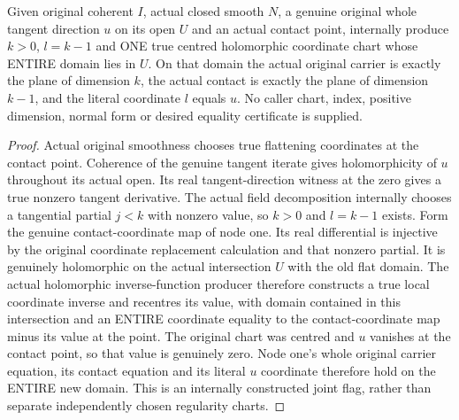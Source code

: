 \begin{theorem}
\label{hir:submersion-contact-coordinates-internal-original-chart}
\leanok
Given original coherent $I$, actual closed smooth $N$, a genuine original
whole tangent direction $u$ on its open $U$ and an actual contact point,
internally produce $k>0$, $l=k-1$ and ONE true centred holomorphic coordinate
chart whose ENTIRE domain lies in $U$. On that domain the actual original
carrier is exactly the plane of dimension $k$, the actual contact is exactly
the plane of dimension $k-1$, and the literal coordinate $l$ equals $u$.
No caller chart, index, positive dimension, normal form or desired equality
certificate is supplied.
\end{theorem}
\begin{proof}
Actual original smoothness chooses true flattening coordinates at the
contact point. Coherence of the genuine tangent iterate gives holomorphicity
of $u$ throughout its actual open. Its real tangent-direction witness at the
zero gives a true nonzero tangent derivative. The actual field decomposition
internally chooses a tangential partial $j<k$ with nonzero value, so $k>0$
and $l=k-1$ exists. Form the genuine contact-coordinate map of node one.
Its real differential is injective by the original coordinate replacement
calculation and that nonzero partial. It is genuinely holomorphic on the
actual intersection $U$ with the old flat domain. The actual holomorphic
inverse-function producer therefore constructs a true local coordinate
inverse and recentres its value, with domain contained in this intersection
and an ENTIRE coordinate equality to the contact-coordinate map minus its
value at the point. The original chart was centred and $u$ vanishes at the
contact point, so that value is genuinely zero. Node one's whole original
carrier equation, its contact equation and its literal $u$ coordinate
therefore hold on the ENTIRE new domain. This is an internally constructed
joint flag, rather than separate independently chosen regularity charts.
\end{proof}

